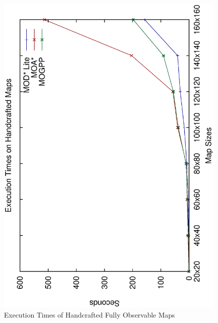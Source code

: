 \documentclass[10pt,journal]{IEEEtran}
\begin{document}
\begin{figure}
\centering
\includegraphics[scale=0.3]{experimental/handcrafted_normal}
\caption{Execution Times of Handcrafted Fully Observable Maps}
\label{fig:hand_fully}
\end{figure}
\end{document}

